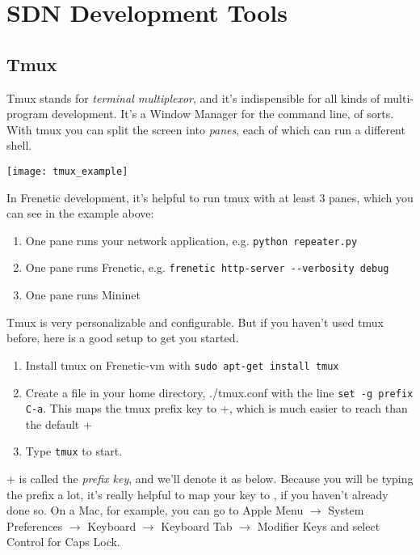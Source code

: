 
\chapter{SDN Development Tools}

\section{Tmux}

Tmux stands for \emph{terminal multiplexor}, and it's indispensible for all kinds of multi-program development.
It's a Window Manager for the command line, of sorts.
With tmux you can split the screen into \emph{panes}, each of which can run a different shell.

\texttt{[image: tmux\_example]}

In Frenetic development, it's helpful to run tmux with at least 3 panes, which you can see in the example above:

\begin{enumerate}
\item One pane runs your network application, e.g. \lstinline[style=BashInputStyle]{python repeater.py}
\item One pane runs Frenetic, e.g. \lstinline[style=BashInputStyle]{frenetic http-server --verbosity debug}
\item One pane runs Mininet
\end{enumerate}

Tmux is very personalizable and configurable.  
But if you haven't used tmux before, here is a good setup to get you started.

\begin{enumerate}
\item Install tmux on Frenetic-vm with \lstinline[style=BashInputStyle]{sudo apt-get install tmux}
\item Create a file in your home directory, ./tmux.conf with the line \lstinline{set -g prefix C-a}.  
This maps the tmux prefix key to \Ctrl+, which is much easier to reach than the default 
\Ctrl+
\item Type \lstinline[style=BashInputStyle]{tmux} to start.
\end{enumerate}

\Ctrl+ is called the \emph{prefix key}, and we'll denote it as  below. 
Because you will be typing the prefix a lot, it's really helpful to map your  key to \Ctrl, if
you haven't already done so.  
On a Mac, for example, you can go to Apple Menu $\rightarrow$ System Preferences $\rightarrow$ Keyboard 
$\rightarrow$ Keyboard Tab $\rightarrow$ Modifier Keys and select Control for Caps Lock.


